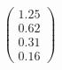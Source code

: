 \documentclass[preview]{standalone}
\begin{document}
\begin{align*}
\begin{pmatrix} 1.25 \\ 0.62 \\ 0.31 \\ 0.16 \end{pmatrix}
\end{align*}
\end{document}
